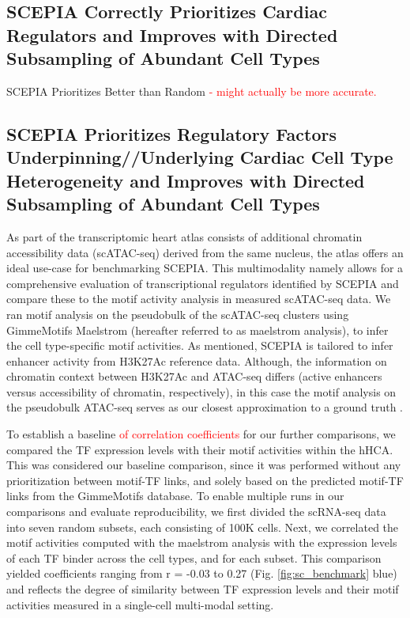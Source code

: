 \subsection{SCEPIA Correctly Prioritizes Cardiac Regulators and Improves with Directed Subsampling of Abundant Cell Types}
SCEPIA Prioritizes Better than Random \textcolor{red}{ - might actually be more accurate.}
\subsection{SCEPIA Prioritizes Regulatory Factors Underpinning//Underlying Cardiac Cell Type Heterogeneity and Improves with Directed Subsampling of Abundant Cell Types}

As part of the transcriptomic heart atlas consists of additional chromatin accessibility data (scATAC-seq) derived from the same nucleus, the atlas offers an ideal use-case for benchmarking SCEPIA. This multimodality namely allows for a comprehensive evaluation of transcriptional regulators identified by SCEPIA and compare these to the motif activity analysis in measured scATAC-seq data. We ran motif analysis on the pseudobulk of the scATAC-seq clusters using GimmeMotifs Maelstrom\cite{Bruse_2018} (hereafter referred to as maelstrom analysis), to infer the cell type-specific motif activities. As mentioned, SCEPIA is tailored to infer enhancer activity from H3K27Ac reference data. Although, the information on chromatin context between H3K27Ac and ATAC-seq differs (active enhancers versus accessibility of chromatin, respectively), in this case the motif analysis on the pseudobulk ATAC-seq serves as our closest approximation to a ground truth . 

To establish a baseline \textcolor{red}{of correlation coefficients} for our further comparisons, we compared the TF expression levels with their motif activities within the hHCA. This was considered our baseline comparison, since it was performed without any prioritization between motif-TF links, and solely based on the predicted motif-TF links from the GimmeMotifs database. To enable multiple runs in our comparisons and evaluate reproducibility, we first divided the scRNA-seq data into seven random subsets, each consisting of 100K cells. Next, we correlated the motif activities computed with the maelstrom analysis with the expression levels of each TF binder across the cell types, and for each subset. This comparison yielded coefficients ranging from r = -0.03 to 0.27 (Fig. \ref{fig:sc_benchmark} blue) and reflects the degree of similarity between TF expression levels and their motif activities measured in a single-cell multi-modal setting.

